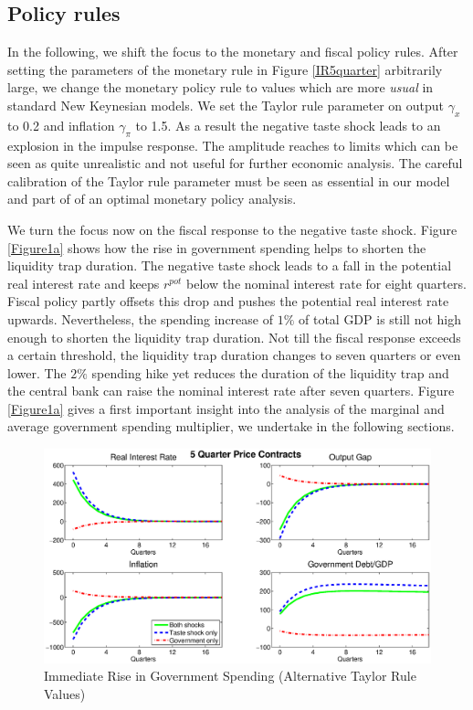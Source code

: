 \documentclass[12pt,a4paper,oneside,titlepage]{article}
\begin{document}
\subsection*{Policy rules}
In the following, we shift the focus to the monetary and fiscal policy rules. After setting the parameters of the monetary rule in Figure \ref{IR5quarter} arbitrarily large, we change the monetary policy rule to values which are more \textit{usual} in standard New Keynesian models. We set the Taylor rule parameter on output $\gamma_x$ to 0.2 and inflation $\gamma_{\pi}$ to 1.5. As a result the negative taste shock leads to an explosion in the impulse response. The amplitude reaches to limits which can be seen as quite unrealistic and not useful for further economic analysis. The careful calibration of the Taylor rule parameter must be seen as essential in our model and part of of an optimal monetary policy analysis.
\par
\bigskip
We turn the focus now on the fiscal response to the negative taste shock. Figure \ref{Figure1a} shows how the rise in government spending helps to shorten the liquidity trap duration. The negative taste shock leads to a fall in the potential real interest rate and keeps $r^{pot}$ below the nominal interest rate for eight quarters. Fiscal policy partly offsets this drop and pushes the potential real interest rate upwards. Nevertheless, the spending increase of $1\%$ of total GDP is still not high enough to shorten the liquidity trap duration. Not till the fiscal response exceeds a certain threshold, the liquidity trap duration changes to seven quarters or even lower. The $2\%$ spending hike yet reduces the duration of the liquidity trap and the central bank can raise the nominal interest rate after seven quarters.
Figure \ref{Figure1a} gives a first important insight into the analysis of the marginal and average government spending multiplier, we undertake in the following sections.

\begin{figure}[p]
\includegraphics[width=\textwidth]{Paperpics/Figure25quarternewtaylorrule}
\caption{Immediate Rise in Government Spending (Alternative Taylor Rule Values)}
\label{IR5quarternewtr}
\end{figure}
\bigskip
\end{document}
